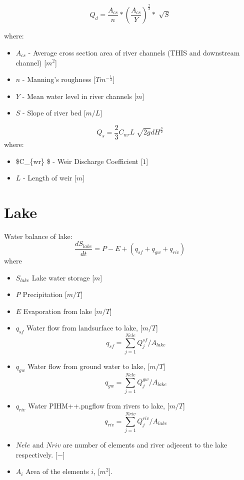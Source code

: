 \documentclass[]{scrbook}
\providecommand{\tightlist}{%
  \setlength{\itemsep}{0pt}\setlength{\parskip}{0pt}}
\begin{document}
\[
Q_{d} = \frac{A_{cs}}{n} * {(\frac{A_{cs}}{Y})} ^ {\frac{2}{3}} * \sqrt[]{S} 
\]

where:

\begin{itemize}
\tightlist
\item
  \(A_{cs}\) - Average cross section area of river channels (THIS and
  downstream channel) {[}\(m^2\){]}
\item
  \(n\) - Manning's roughness {[}\(T m^{-\frac{1}{3}}\){]}
\item
  \(Y\) - Mean water level in river channels {[}\(m\){]}
\item
  \(S\) - Slope of river bed {[}\(m/L\){]}
\end{itemize}

\[
Q_s = \frac{2}{3} C_{wr}  L  \sqrt[]{2g} {dH}^ \frac{3}{2}
\] where:

\begin{itemize}
\tightlist
\item
  \$C\_\{wr\} \$ - Weir Discharge Coefficient {[}\(1\){]}
\item
  \(L\) - Length of weir {[}\(m\){]}
\end{itemize}

\chapter{Lake}\label{lake}

Water balance of lake: \[
  \frac{d S_{lake}}{d t} = P - E + ( q_{sf} +  q_{gw} + q_{riv})
\] where

\begin{itemize}
\tightlist
\item
  \(S_{lake}\) Lake water storage {[}\(m\){]}
\item
  \(P\) Precipitation {[}\(m/T\){]}
\item
  \(E\) Evaporation from lake {[}\(m/T\){]}
\item
  \(q_{sf}\) Water flow from landsurface to lake, {[}\(m/T\){]}
  \[q_{sf} = \sum_{j=1}^{Nele} Q_{j}^{sf} / A_{lake}\]
\item
  \(q_{gw}\) Water flow from ground water to lake, {[}\(m/T\){]}
  \[q_{gw} = \sum_{j=1}^{Nele} Q_{j}^{gw} / A_{lake}\]
\item
  \(q_{riv}\) Water PIHM++.pngflow from rivers to lake, {[}\(m/T\){]}
  \[q_{riv} = \sum_{j=1}^{Nriv} Q_{j}^{riv} / A_{lake}\]
\item
  \(Nele\) and \(Nriv\) are number of elements and river adjecent to the
  lake respectively. {[}\(-\){]}
\item
  \(A_i\) Area of the elements \(i\), {[}\(m^2\){]}.
\end{itemize}
\end{document}
